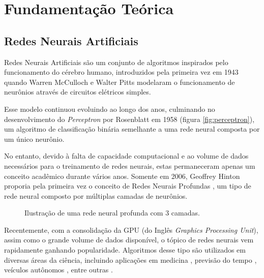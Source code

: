 \chapter{Fundamentação Teórica}

\section{Redes Neurais Artificiais}
\label{sec:dnn}


Redes Neurais Artificiais são um conjunto de algoritmos inspirados pelo funcionamento do cérebro humano, introduzidos pela primeira vez em 1943 quando Warren McCulloch e Walter Pitts modelaram o funcionamento de neurônios através de circuitos elétricos simples\cite{mccullochLogicalCalculusIdeas1943}.

Esse modelo continuou evoluindo ao longo dos anos, culminando no desenvolvimento do \textit{Perceptron} por Rosenblatt em 1958 \cite{rosenblattPerceptronProbabilisticModel1958} (figura \ref{fig:perceptron}), um algoritmo de classificação binária semelhante a uma rede neural composta por um único neurônio.

No entanto, devido à falta de capacidade computacional e ao volume de dados necessários para o treinamento de redes neurais, estas permaneceram apenas um conceito acadêmico durante vários anos.
Somente em 2006, Geoffrey Hinton proporia pela primeira vez o conceito de Redes Neurais Profundas \cite{hintonFastLearningAlgorithm2006}, um tipo de rede neural composto por múltiplas camadas de neurônios.

\begin{figure}[ht]
    \centering
    
    \caption{Ilustração de uma rede neural profunda com 3 camadas.}
    \label{fig:dnn}
\end{figure}

Recentemente, com a consolidação da GPU (do Inglês \textit{Graphics Processing Unit}), assim como o grande volume de dados disponível, o tópico de redes neurais vem rapidamente ganhando popularidade.
Algoritmos desse tipo são utilizados em diversas áreas da ciência, incluindo aplicações em medicina \cite{hannunCardiologistLevelArrhythmiaDetection2019,phamPredictingHealthcareTrajectories2017,houDeepSFDeepConvolutional2018}, previsão do tempo \cite{akramSequenceSequenceWeather2016}, veículos autônomos \cite{bojarskiEndEndLearning2016,yudinObjectDetectionDeep2019}, entre outras \cite{abiodunStateoftheartArtificialNeural2018}.

